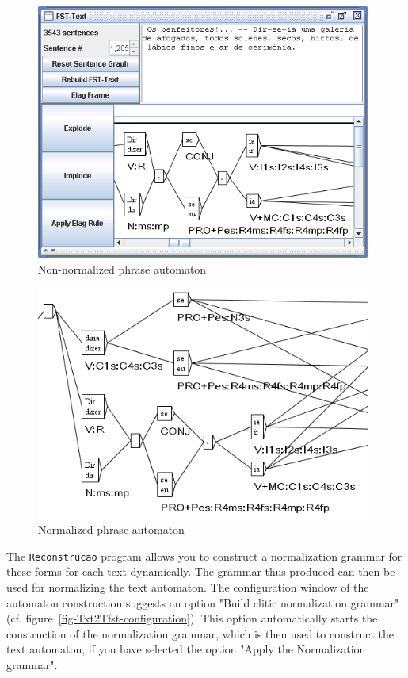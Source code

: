 \begin{figure}[!ht]
\begin{center}
\includegraphics[width=11cm]{resources/img/fig7-6.png}
\caption{Non-normalized phrase automaton\label{fig-1285-not-normalized}}
\end{center}
\end{figure}
\begin{figure}[!ht]
\begin{center}
\includegraphics[width=11cm]{resources/img/fig7-7.png}
\caption{Normalized phrase automaton\label{fig-1285-normalized}}
\end{center}
\end{figure}
\clearpage

\bigskip
\noindent The \verb+Reconstrucao+ program allows you to construct a
normalization grammar for these forms for each text dynamically. The grammar thus produced can then be
used for normalizing the text automaton. The configuration window of the
automaton construction suggests an option "Build clitic normalization grammar"
(cf. figure~\ref{fig-Txt2Tfst-configuration}). This option
automatically starts the construction of the normalization grammar, which is then
used to construct the text automaton, if you have selected the option "Apply the
Normalization grammar".




